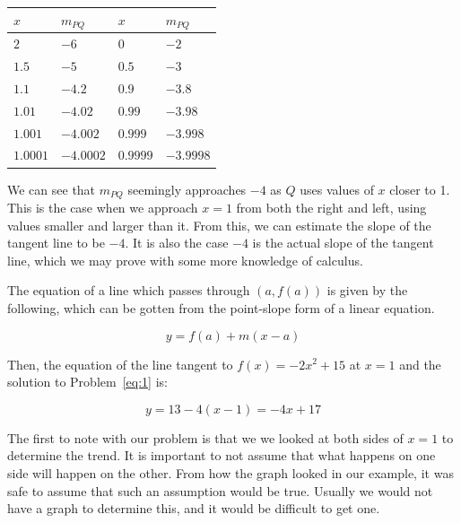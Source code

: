 \documentclass[12pt]{article}
\theoremstyle{definition}
\begin{document}
\begin{table}[h]
    \renewcommand{\arraystretch}{1.5}
    \centering
    \begin{tabular}{>{\centering\arraybackslash}m{1.5cm}|>{\centering\arraybackslash}m{1.5cm}|>{\centering\arraybackslash}m{1.5cm}|>{\centering\arraybackslash}m{1.5cm}}
        $x$      & $m_{PQ}$  & $x$      & $m_{PQ}$  \\ \hline
        $2$      & $-6$      & $0$      & $-2$      \\
        $1.5$    & $-5$      & $0.5$    & $-3$      \\
        $1.1$    & $-4.2$    & $0.9$    & $-3.8$    \\
        $1.01$   & $-4.02$   & $0.99$   & $-3.98$   \\
        $1.001$  & $-4.002$  & $0.999$  & $-3.998$  \\
        $1.0001$ & $-4.0002$ & $0.9999$ & $-3.9998$
    \end{tabular}
\end{table}

We can see that $m_{PQ}$ seemingly approaches $-4$ as $Q$ uses values of $x$ closer to 1.
This is the case when we approach $x=1$ from both the right and left, using values smaller and larger than it.
From this, we can estimate the slope of the tangent line to be $-4$.
It is also the case $-4$ is the actual slope of the tangent line, which we may prove with some more knowledge of calculus.

The equation of a line which passes through $(a, f(a))$ is given by the following, which can be gotten from the point-slope form of a linear equation.

\begin{equation}
    y = f(a) + m(x-a) \label{eq:2}
\end{equation}

Then, the equation of the line tangent to $f(x)=-2x^2+15$ at $x=1$ and the solution to Problem~\eqref{eq:1} is:

\begin{equation}
    y = 13 - 4(x-1) = -4x + 17
\end{equation}

The first to note with our problem is that we we looked at both sides of $x=1$ to determine the trend.
It is important to not assume that what happens on one side will happen on the other.
From how the graph looked in our example, it was safe to assume that such an assumption would be true.
Usually we would not have a graph to determine this, and it would be difficult to get one.
\end{document}
